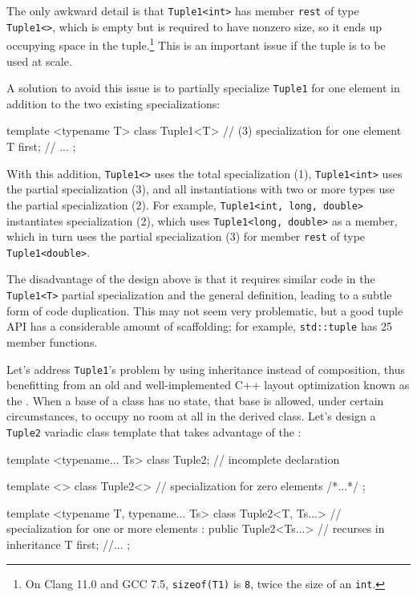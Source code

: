 The only awkward detail is that \lstinline!Tuple1<int>! has member
\lstinline!rest! of type \lstinline!Tuple1<>!, which is empty but is required
to have nonzero size, so it ends up occupying space in the
tuple.\footnote{On Clang 11.0 and GCC 7.5,
\lstinline!sizeof(T1)! is \lstinline!8!, twice the size of an \lstinline!int!.} This is an important issue if the
tuple is to be used at scale.

A solution to avoid this issue is to partially specialize
\lstinline!Tuple1! for one element in addition to the two existing
specializations:

\begin{emcppslisting}[emcppsbatch=e37]
template <typename T>
class Tuple1<T>               // (3) specialization for one element
{
    T first;
    // ...
};
\end{emcppslisting}
    

\noindent With this addition, \lstinline!Tuple1<>! uses the total specialization (1),
\lstinline!Tuple1<int>! uses the partial specialization (3), and all
instantiations with two or more types use the partial specialization
(2). For example, \lstinline!Tuple1<int,!~\lstinline!long,!~\lstinline!double>!
instantiates specialization (2), which uses
\lstinline!Tuple1<long,!~\lstinline!double>! as a member, which in turn uses
the partial specialization (3) for member \lstinline!rest! of type
\lstinline!Tuple1<double>!.

The disadvantage of the design above is that it requires similar code in
the \lstinline!Tuple1<T>! partial specialization and the general
definition, leading to a subtle form of code duplication. This may not
seem very problematic, but a good tuple API has a considerable amount of
scaffolding; for example, \lstinline!std::tuple! has 25 member functions.

Let's address \lstinline!Tuple1!'s problem by using inheritance instead of
composition, thus benefitting from an old and well-implemented C++
layout optimization known as the . When
a base of a class has no state, that base is allowed, under certain
circumstances, to occupy no room at all in the derived class. Let's
design a \lstinline!Tuple2! variadic class template that takes advantage of
the :

\begin{emcppslisting}[emcppsbatch=e37]
template <typename... Ts>
class Tuple2;                // incomplete declaration

template <>
class Tuple2<>               // specialization for zero elements
{ /*...*/ };

template <typename T, typename... Ts>
class Tuple2<T, Ts...>       // specialization for one or more elements
    : public Tuple2<Ts...>   // recurses in inheritance
{
    T first;
    //...
};
\end{emcppslisting}
    

